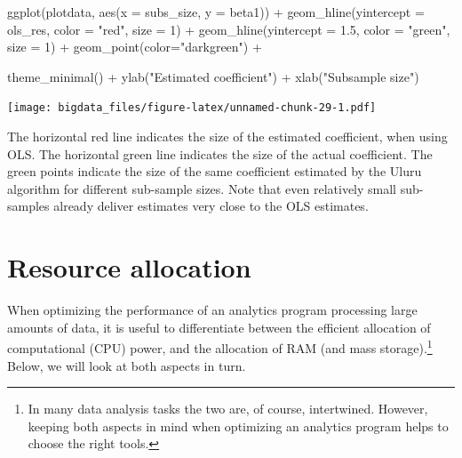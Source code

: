 \documentclass[
  12pt,
]{style/krantz}
\newenvironment{Shaded}{\begin{snugshade}}{\end{snugshade}}
\newcommand{\AttributeTok}[1]{\textcolor[rgb]{0.77,0.63,0.00}{#1}}
\newcommand{\DecValTok}[1]{\textcolor[rgb]{0.00,0.00,0.81}{#1}}
\newcommand{\FloatTok}[1]{\textcolor[rgb]{0.00,0.00,0.81}{#1}}
\newcommand{\FunctionTok}[1]{\textcolor[rgb]{0.00,0.00,0.00}{#1}}
\newcommand{\NormalTok}[1]{#1}
\newcommand{\SpecialCharTok}[1]{\textcolor[rgb]{0.00,0.00,0.00}{#1}}
\newcommand{\StringTok}[1]{\textcolor[rgb]{0.31,0.60,0.02}{#1}}
\begin{document}
\begin{Shaded}
\begin{Highlighting}[]
\FunctionTok{ggplot}\NormalTok{(plotdata, }\FunctionTok{aes}\NormalTok{(}\AttributeTok{x =}\NormalTok{ subs\_size, }\AttributeTok{y =}\NormalTok{ beta1)) }\SpecialCharTok{+}
     \FunctionTok{geom\_hline}\NormalTok{(}\AttributeTok{yintercept =}\NormalTok{ ols\_res,}
                \AttributeTok{color =} \StringTok{"red"}\NormalTok{, }
                \AttributeTok{size =} \DecValTok{1}\NormalTok{) }\SpecialCharTok{+}
       \FunctionTok{geom\_hline}\NormalTok{(}\AttributeTok{yintercept =} \FloatTok{1.5}\NormalTok{,}
                \AttributeTok{color =} \StringTok{"green"}\NormalTok{,}
                \AttributeTok{size =} \DecValTok{1}\NormalTok{) }\SpecialCharTok{+}
     \FunctionTok{geom\_point}\NormalTok{(}\AttributeTok{color=}\StringTok{"darkgreen"}\NormalTok{) }\SpecialCharTok{+} 

     \FunctionTok{theme\_minimal}\NormalTok{() }\SpecialCharTok{+}
     \FunctionTok{ylab}\NormalTok{(}\StringTok{"Estimated coefficient"}\NormalTok{) }\SpecialCharTok{+}
     \FunctionTok{xlab}\NormalTok{(}\StringTok{"Subsample size"}\NormalTok{)}
\end{Highlighting}
\end{Shaded}

\texttt{[image: bigdata\_files/figure-latex/unnamed-chunk-29-1.pdf]}

The horizontal red line indicates the size of the estimated coefficient, when using OLS. The horizontal green line indicates the size of the actual coefficient. The green points indicate the size of the same coefficient estimated by the Uluru algorithm for different sub-sample sizes. Note that even relatively small sub-samples already deliver estimates very close to the OLS estimates.

\hypertarget{resource-allocation}{%
\chapter{Resource allocation}\label{resource-allocation}}

When optimizing the performance of an analytics program processing large amounts of data, it is useful to differentiate between the efficient allocation of computational (CPU) power, and the allocation of RAM (and mass storage).\footnote{In many data analysis tasks the two are, of course, intertwined. However, keeping both aspects in mind when optimizing an analytics program helps to choose the right tools.} Below, we will look at both aspects in turn.
\end{document}

